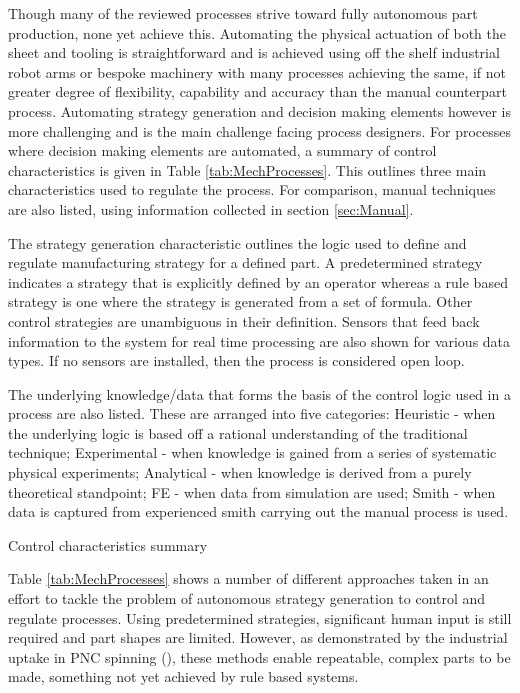 Though many of the reviewed processes strive toward fully autonomous part production, none yet achieve this. 
Automating the physical actuation of both the sheet and tooling is straightforward and is achieved using off the shelf industrial robot arms or bespoke machinery with many processes achieving the same, if not greater degree of flexibility, capability and accuracy than the manual counterpart process. Automating strategy generation and decision making elements however is more challenging and is the main challenge facing process designers. For processes where decision making elements are automated, a summary of control characteristics is given in Table \ref{tab:MechProcesses}. This outlines three main characteristics used to regulate the process. For comparison, manual techniques are also listed, using information collected in section \ref{sec:Manual}.

The strategy generation characteristic outlines the logic used to define and regulate manufacturing strategy for a defined part. A predetermined strategy indicates a strategy that is explicitly defined by an operator whereas a rule based strategy is one where the strategy is generated from a set of formula. Other control strategies are unambiguous in their definition. Sensors that feed back information to the system for real time processing are also shown for various data types. If no sensors are installed, then the process is considered open loop.

The underlying knowledge/data that forms the basis of the control logic used in a process are also listed. These are arranged into five categories: Heuristic - when the underlying logic is based off a rational understanding of the traditional technique; Experimental - when knowledge is gained from a series of systematic physical experiments; Analytical - when knowledge is derived from a purely theoretical standpoint; FE - when data from simulation are used; Smith - when data is captured from experienced smith carrying out the manual process is used.

\renewcommand{\arraystretch}{1.2} 
\begin{table}[h] 
    \centering
    \resizebox{\linewidth}{!}{
        
        }
    \caption{Control characteristics summary}
    \label{tab:MechProcesses}
\end{table}



Table \ref{tab:MechProcesses} shows a number of different approaches taken in an effort to tackle the problem of autonomous strategy generation to control and regulate processes. Using predetermined strategies, significant human input is still required and part shapes are limited. However, as demonstrated by the industrial uptake in PNC spinning (\citep{Lloyd1986AnProspective}), these methods enable repeatable, complex parts to be made, something not yet achieved by rule based systems.

